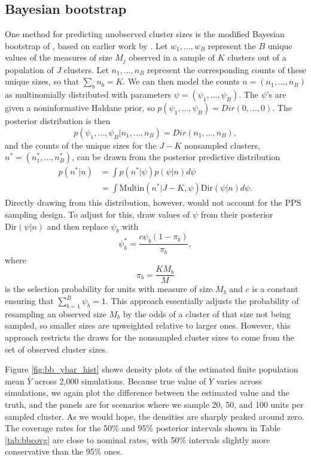 \documentclass[12pt,a4paper]{article}
\begin{document}
\subsection*{Bayesian bootstrap}
One method for predicting unobserved cluster sizes is the modified Bayesian bootstrap of \cite{zangeneh2015}, based on earlier work by \cite{littlezheng2007}. Let $w_1, \ldots, w_B$ represent the $B$ unique values of the measures of size $M_j$ observed in a sample of $K$ clusters out of a population of $J$ clusters. Let $n_1, \ldots, n_B$ represent the corresponding counts of these unique sizes, so that $\sum_b n_b = K$. We can then model the counts $n = (n_1, \ldots, n_B)$ as multinomially distributed with parameters $\psi = (\psi_1, \ldots, \psi_B)$. The $\psi$'s are given a noninformative Haldane prior, so $p(\psi_1, \ldots, \psi_B) = Dir(0, \ldots, 0)$. The posterior distribution is then
\[
	p(\psi_1, \ldots, \psi_B | n_1, \ldots, n_B)	= Dir(n_1, \ldots, n_B),
\]
and the counts of the unique sizes for the $J-K$ nonsampled clusters, $n^* = (n_1^*, \ldots, n_B^*)$, can be drawn from the posterior predictive distribution
\begin{align*}
	p(n^*|n) &= \int p(n^*|\psi) p(\psi|n)d\psi \\
		&= \int \text{Multin}(n^* | J-K, \psi) \text{Dir}(\psi|n) d\psi.
\end{align*}
Directly drawing from this distribution, however, would not account for the PPS sampling design. To adjust for this, \cite{littlezheng2007} draw values of $\psi$ from their posterior $\text{Dir}(\psi|n)$ and then replace $\psi_b$ with
\[
	\psi_b^* = \frac{c \psi_b (1-\pi_b)}{\pi_b},
\]
where
\[
	\pi_b = \frac{K M_b}{M}
\]
is the selection probability for units with measure of size $M_b$ and $c$ is a constant ensuring that $\sum_{b=1}^B \psi_b = 1$. This approach essentially adjusts the probability of resampling an observed size $M_b$ by the odds of a cluster of that size not being sampled, so smaller sizes are upweighted relative to larger ones. However, this approach restricts the draws for the nonsampled cluster sizes to come from the set of observed cluster sizes.

Figure \ref{fig:bb_ybar_hist} shows density plots of the estimated finite population mean $\overline{Y}$ across 2,000 simulations. Because true value of $\overline{Y}$ varies across simulations, we again plot the difference between the estimated value and the truth, and the panels are for scenarios where we sample 20, 50, and 100 units per sampled cluster. As we would hope, the densities are sharply peaked around zero. The coverage rates for the 50\% and 95\% posterior intervals shown in Table \ref{tab:bbcovg} are close to nominal rates, with 50\% intervals slightly more conservative than the 95\% ones. 
\end{document}
